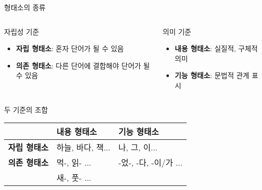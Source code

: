 \documentclass[11pt, aspectratio=169]{beamer}
\begin{document}
\begin{frame}[t]{형태소의 종류}
\begin{columns}
\begin{column}[T]{0.47\textwidth}
    \begin{block}{자립성 기준}
        \begin{itemize}
            \item \textbf{자립 형태소}: 혼자 단어가 될 수 있음
            \item \textbf{의존 형태소}: 다른 단어에 결합해야 단어가 될 수 있음
        \end{itemize}
    \end{block}
\end{column}
\begin{column}[T]{0.46\textwidth}
    \begin{block}{의미 기준}
        \begin{itemize}
            \item \textbf{내용 형태소}: 실질적, 구체적 의미
            \item \textbf{기능 형태소}: 문법적 관계 표시
        \end{itemize}
    \end{block}
\end{column}
\end{columns}

\begin{block}{두 기준의 조합}
  \begin{center}
    \begin{tabular}{l|l|l}
        \hline
         & \textbf{내용 형태소} & \textbf{기능 형태소} \\
        \hline
        \textbf{자립 형태소} & 하늘, 바다, 책... & 나, 그, 이...\\
        \hline
        \textbf{의존 형태소} & 먹-, 읽- ... & -었-, -다, -이/가 ...\\
         & 새-, 풋- ... & \\
        \hline
    \end{tabular}    
  \end{center}
\end{block}

\end{frame}
\end{document}
